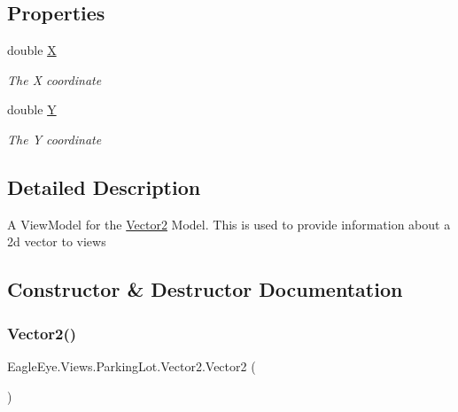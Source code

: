 \subsection*{Properties}
\begin{DoxyCompactItemize}
\item 
double \mbox{\hyperlink{class_eagle_eye_1_1_views_1_1_parking_lot_1_1_vector2_a55e65b3a51370ae1c14539d818309ead}{X}}
\begin{DoxyCompactList}\small\item\em The X coordinate \end{DoxyCompactList}\item 
double \mbox{\hyperlink{class_eagle_eye_1_1_views_1_1_parking_lot_1_1_vector2_aac35e7838fd7858b43c98df7e7d3c483}{Y}}
\begin{DoxyCompactList}\small\item\em The Y coordinate \end{DoxyCompactList}\end{DoxyCompactItemize}


\subsection{Detailed Description}
A View\+Model for the \mbox{\hyperlink{class_eagle_eye_1_1_views_1_1_parking_lot_1_1_vector2}{Vector2}} Model. This is used to provide information about a 2d vector to views 



\subsection{Constructor \& Destructor Documentation}
\mbox{\label{class_eagle_eye_1_1_views_1_1_parking_lot_1_1_vector2_a7ad4985eae411d4785f7da5964fafa8c}} 
\subsubsection{\texorpdfstring{Vector2()}{Vector2()}\hspace{0.1cm}{\footnotesize\ttfamily [1/2]}}
{\footnotesize\ttfamily Eagle\+Eye.\+Views.\+Parking\+Lot.\+Vector2.\+Vector2 (\begin{DoxyParamCaption}{ }\end{DoxyParamCaption})}



